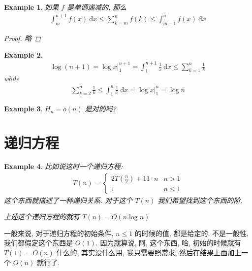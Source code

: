 \documentclass[a4paper, 10pt]{ctexart} %
\newtheorem{example}{Example}
\begin{document}
\begin{example}
如果 $f$ 是单调递减的, 那么 
\begin{align*}
    \int ^{n + 1} _{m} f\left(x\right) \ \mathrm{d} x 
    \le  \sum_{k= m }  ^{n} f\left(k\right) 
    \le \int ^{n} _{m-1} f\left(x\right) \ \mathrm{d} x
\end{align*}
\begin{proof}
    略
\end{proof}
\end{example}
\begin{example}
    \begin{align*}
        \log \left( n + 1\right) = \log x | ^{n+1} _{1} = \int  ^{ n+1 }_{1} \frac{1}{x} \ \mathrm{d}x \le \sum_{k=1} ^{n} \frac{1}{k}
    \end{align*}
    while 
    \begin{align*}
        \sum_{k=2} ^{n} \frac{1}{k} \le \int ^{n} _{1} \frac{1}{x} \ \mathrm{d} x  = \log  x | ^{n} _{1}  = \log n
    \end{align*} 
\end{example}
\begin{example}
    $H_{n} = o\left(n\right)$ 是对的吗?
\end{example}

\section{递归方程}
\begin{example}
    比如说这时一个递归方程: 
    \begin{align*}
        T \left(n\right) = 
        \begin{cases}
            2 T \left( \frac{n}{2}\right) + 11 \cdot n & n > 1\\
            1 & n \le 1
        \end{cases}
    \end{align*}
    这个东西就描述了一种递归关系. 对于这个 $T \left(n\right)$ 我们希望找到这个东西的阶. 
    
    上述这个递归方程的就有 $ T \left(n\right) =  O\left( n \log  n  \right)$
\end{example}

一般来说, 对于递归方程的初始条件,  $n \le 1$ 的时候的值, 都是给定的. 不是一般性, 我们都假定这个东西是 $O(1)$. 
因为就算说, 阿, 这个东西, 哈, 初始的时候就有 $T \left(1\right)  = O\left(n\right)$ 什么的, 其实没什么用, 我只需要照常求,
然后在结果上面加上一个 $O\left(n\right)$ 就行了. 
\end{document}
